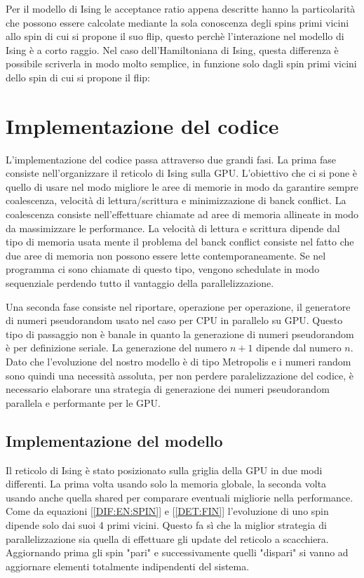 \documentclass[a4paper,12pt]{article}
\begin{document}
Per il modello di Ising le acceptance ratio appena descritte hanno la particolarità che possono essere calcolate mediante la sola conoscenza degli spins primi vicini allo spin di cui si propone il suo flip, questo perchè l'interazione nel modello di Ising  è a corto raggio. Nel caso dell'Hamiltoniana di Ising, questa differenza è possibile scriverla in modo molto semplice, in funzione solo dagli spin primi vicini dello spin di cui si propone il flip:



\section{Implementazione del codice}
L'implementazione del codice passa attraverso due grandi fasi. La prima fase consiste nell'organizzare il reticolo di Ising sulla GPU. L'obiettivo che ci si pone è quello di usare nel modo migliore le aree di memorie in modo da garantire sempre coalescenza, velocità di lettura/scrittura e minimizzazione di banck conflict. La coalescenza consiste nell'effettuare chiamate ad aree di memoria allineate in modo da massimizzare le performance. La velocità di lettura e scrittura dipende dal tipo di memoria usata mente il problema del banck conflict consiste nel fatto che due aree di memoria non possono essere lette contemporaneamente. Se nel programma ci sono chiamate di questo tipo,  vengono schedulate in modo sequenziale perdendo tutto il vantaggio della parallelizzazione.

Una seconda fase consiste nel riportare, operazione per operazione, il generatore di numeri pseudorandom usato nel caso per CPU in parallelo su GPU. Questo tipo di passaggio non è banale in quanto la generazione di numeri pseudorandom è per definizione seriale. La generazione del numero $n+1$ dipende dal numero $n$. Dato che l'evoluzione del nostro modello è di tipo Metropolis e i numeri random sono quindi una necessità assoluta, per non perdere paralelizzazione del codice, è necessario elaborare una strategia di generazione dei numeri pseudorandom parallela e performante per le GPU.

\subsection{Implementazione del modello}
Il reticolo di Ising è stato posizionato sulla griglia  della GPU in due modi differenti. La prima volta usando solo la memoria globale, la seconda volta usando anche quella shared per comparare eventuali migliorie nella performance. Come da equazioni [\ref{DIF:EN:SPIN}] e [\ref{DET:FIN}] l'evoluzione di uno spin dipende solo dai suoi 4 primi vicini. Questo fa sì che la miglior strategia di parallelizzazione sia quella di effettuare gli update del reticolo a scacchiera. Aggiornando prima gli spin "pari" e successivamente quelli "dispari" si vanno ad aggiornare elementi totalmente indipendenti del sistema.
\end{document}
